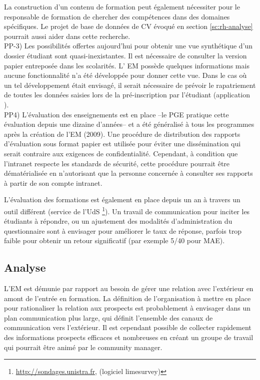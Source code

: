 \documentclass{book}
\begin{document}
La construction d'un contenu de formation peut également nécessiter pour le 
responsable de formation de chercher des compétences dans des domaines spécifiques. 
Le projet de base de données de CV évoqué en section \ref{sc:rh-analyse} pourrait 
aussi aider dans cette recherche.\\



PP-3) Les possibilités offertes aujourd'hui pour obtenir une vue synthétique
d'un dossier étudiant sont quasi-inexistantes. Il est nécessaire de consulter 
la version papier entreposée dans les scolarités. L' EM 
 possède quelques informations mais aucune fonctionnalité n'a été développée
pour donner cette vue. Dans le cas où un tel développement était envisagé,
il serait nécessaire de prévoir le rapatriement de toutes les données 
saisies lors de la pré-inscription par l'étudiant (application ).\\


PP4) L'évaluation des enseignements est en place --le PGE pratique cette évaluation 
depuis  une dizaine d'années-- et a été généralisé à tous les programmes après
la création de l'EM (2009). Une procédure de distribution des rapports d'évaluation
sous format papier est utilisée pour éviter une dissémination qui serait contraire
aux exigences de confidentialité. Cependant, à condition que l'intranet respecte 
les standards de sécurité, cette procédure pourrait être dématérialisée en n'autorisant
que la personne concernée à consulter ses rapports à partir de son compte intranet.

L'évaluation des formations est également en place depuis un an à travers 
un outil différent (service de l'UdS%
 \footnote{\url{http://sondages.unistra.fr}, (logiciel limesurvey)}).
Un travail de communication pour inciter les étudiants à répondre, ou un ajustement 
des modalités d'administration du questionnaire sont à envisager pour améliorer
le taux de réponse, parfois trop faible pour obtenir un retour significatif (par
exemple 5/40 pour MAE).
\\



\subsection{Analyse}

L'EM est démunie par rapport au besoin de gérer une relation avec l'extérieur
en amont de l'entrée en formation. La définition de l'organisation à
mettre en place pour rationaliser la relation aux prospects est probablement à 
envisager dans un plan communication plus large, qui définit l'ensemble des canaux
de communication vers l'extérieur. Il est cependant possible de collecter rapidement
des informations prospects efficaces et nombreuses en créant un groupe de travail
qui pourrait être animé par le community manager.
\end{document}
